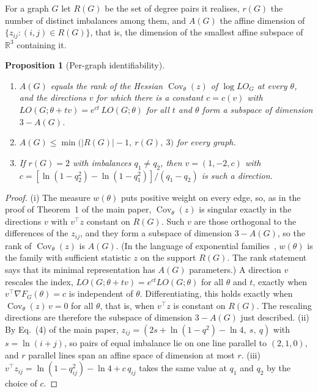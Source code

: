 \documentclass[a5paper, 10pt]{article}
\theoremstyle{plain}
\newtheorem{proposition}[theorem]{Proposition}
\theoremstyle{remark}
\theoremstyle{definition}
\begin{document}
  For a graph $G$ let $R(G)$ be the set of degree pairs it realises,
  $r(G)$ the number of distinct imbalances among them, and $A(G)$ the
  affine dimension of $\{z_{ij} : (i,j) \in R(G)\}$, that is, the
  dimension of the smallest affine subspace of $\mathbb{R}^3$
  containing it.

  \begin{proposition}[Per-graph identifiability]\label{prop:identrank}
  \begin{enumerate}
  \item[(i)] $A(G)$ equals the rank of the Hessian
  $\operatorname{Cov}_{\theta}(z)$ of $\log LO_G$ at every $\theta$, and the
  directions $v$ for which there is a constant $c = c(v)$ with $LO(G;\theta + tv) = e^{ct}\,LO(G;\theta)$ for all $t$ and $\theta$ form a subspace of dimension $3 - A(G)$.
  \item[(ii)] $A(G) \le \min\bigl(|R(G)| - 1,\ r(G),\ 3\bigr)$ for every
  graph.
  \item[(iii)] If $r(G) = 2$ with imbalances $q_1 \neq q_2$, then
  $v = (1, -2, c)$ with
  $c = [\ln(1 - q_2^2) - \ln(1 - q_1^2)]/(q_1 - q_2)$ is such a
  direction.
  \end{enumerate}
  \end{proposition}

  \begin{proof}
  (i) The measure $w(\theta)$ puts positive weight on every edge, so,
  as in the proof of Theorem~1 of the main paper,
  $\operatorname{Cov}_{\theta}(z)$ is singular exactly in the directions
  $v$ with $v^{\top} z$ constant on $R(G)$. Such $v$ are those
  orthogonal to the differences of the $z_{ij}$, and they form a
  subspace of dimension $3 - A(G)$, so the rank of
  $\operatorname{Cov}_{\theta}(z)$ is $A(G)$. (In the language of
  exponential families~\cite{Brown1986}, $w(\theta)$ is the family with
  sufficient statistic $z$ on the support $R(G)$. The rank statement
  says that its minimal representation has $A(G)$ parameters.) A
  direction $v$ rescales the index, $LO(G;\theta+tv) = e^{ct} LO(G;\theta)$
  for all $\theta$ and $t$, exactly when $v^{\top} \nabla F_G(\theta) = c$
  is independent of $\theta$. Differentiating, this holds exactly when
  $\operatorname{Cov}_{\theta}(z)\, v = 0$ for all $\theta$, that is,
  when $v^{\top} z$ is constant on $R(G)$. The rescaling directions are
  therefore the subspace of dimension $3 - A(G)$ just described. (ii) By Eq.~(4) of the main paper,
  $z_{ij} = (2s + \ln(1-q^2) - \ln 4,\ s,\ q)$ with $s = \ln(i+j)$, so
  pairs of equal imbalance lie on one line parallel to $(2,1,0)$, and
  $r$ parallel lines span an affine space of dimension at most $r$.
  (iii) $v^{\top} z_{ij} = \ln(1 - q_{ij}^2) - \ln 4 + c\,q_{ij}$ takes
  the same value at $q_1$ and $q_2$ by the choice of $c$.
  \end{proof}
\end{document}
